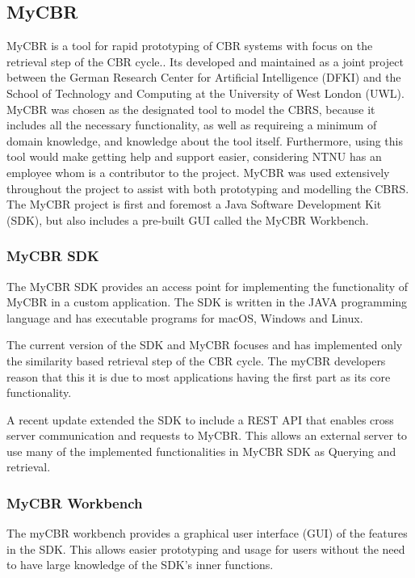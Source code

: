 \subsection{MyCBR}
MyCBR is a tool for rapid prototyping of CBR systems with focus on the retrieval step of the CBR cycle.\cite{MyCBR}. Its developed and maintained as a joint project between the German Research Center for Artificial Intelligence (DFKI) and the School of Technology and Computing at the University of West London (UWL)\cite{Stahl2008}. MyCBR was chosen as the designated tool to model the CBRS, because it includes all the necessary functionality, as well as requireing a minimum of domain knowledge, and knowledge about the tool itself. Furthermore, using this tool would make getting help and support easier, considering NTNU has an employee whom is a contributor to the project. MyCBR was used extensively throughout the project to assist with both prototyping and modelling the CBRS. The MyCBR project is first and foremost a Java Software Development Kit (SDK), but also includes a pre-built GUI called the MyCBR Workbench. 

\subsubsection{MyCBR SDK}
The MyCBR SDK provides an access point for implementing the functionality of MyCBR in a custom application. The SDK is written in the JAVA programming language and has executable programs for macOS, Windows and Linux\cite{MyCBR}. 

The current version of the SDK and MyCBR focuses and has implemented only the similarity based retrieval step of the CBR cycle. The myCBR developers reason that this it is due to most applications having the first part as its core functionality\cite{Stahl2008}.  

A recent update extended the SDK to include a REST API that enables cross server communication and requests to MyCBR. This allows an external server to use many of the implemented functionalities in MyCBR SDK as Querying and retrieval.

\subsubsection{MyCBR Workbench}

The myCBR workbench provides a graphical user interface (GUI) of the features in the SDK. This allows easier prototyping and usage for users without the need to have large knowledge of the SDK's inner functions\cite{bach2014knowledge}. 

